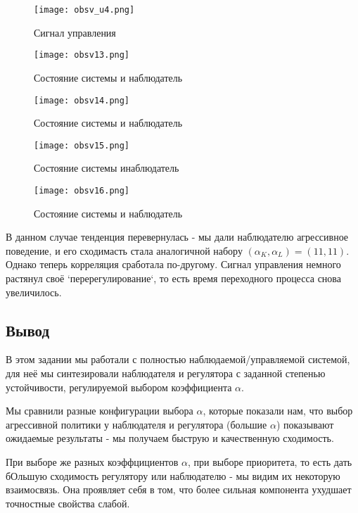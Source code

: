 \newpage
\begin{figure}[ht]
  \centering
  \texttt{[image: obsv\_u4.png]}
  \caption{Сигнал управления}
\end{figure}
\begin{figure}[ht]
  \centering
  \texttt{[image: obsv13.png]}
  \caption{Состояние системы и наблюдатель}
\end{figure}
\newpage
\begin{figure}[ht]
  \centering
  \texttt{[image: obsv14.png]}
  \caption{Состояние системы и наблюдатель}
\end{figure}
\begin{figure}[ht]
  \centering
  \texttt{[image: obsv15.png]}
  \caption{Состояние системы инаблюдатель}
\end{figure}
\newpage
\begin{figure}[ht]
  \centering
  \texttt{[image: obsv16.png]}
  \caption{Состояние системы и наблюдатель}
\end{figure}

В данном случае тенденция перевернулась - мы дали наблюдателю агрессивное поведение, и его сходимасть стала аналогичной набору $(\alpha_K, \alpha_L)=(11, 11)$. Однако теперь корреляция сработала по-другому. 
Сигнал управления немного растянул своё `перерегулирование`, то есть время переходного процесса снова увеличилось.



\subsection{Вывод}
В этом задании мы работали с полностью наблюдаемой/управляемой системой, для неё мы синтезировали наблюдателя и регулятора с заданной степенью устойчивости, регулируемой выбором коэффициента $\alpha$.

Мы сравнили разные конфигурации выбора $\alpha$, которые показали нам, что выбор агрессивной политики у наблюдателя и регулятора (большие $\alpha$) показывают ожидаемые результаты - мы получаем быструю и качественную сходимость. 

При выборе же разных коэффцициентов $\alpha$, при выборе приоритета, то есть дать бОльшую сходимость регулятору или наблюдателю - мы видим их некоторую взаимосвязь. Она проявляет себя в том, что более сильная компонента ухудшает точностные свойства слабой.
\endinput 